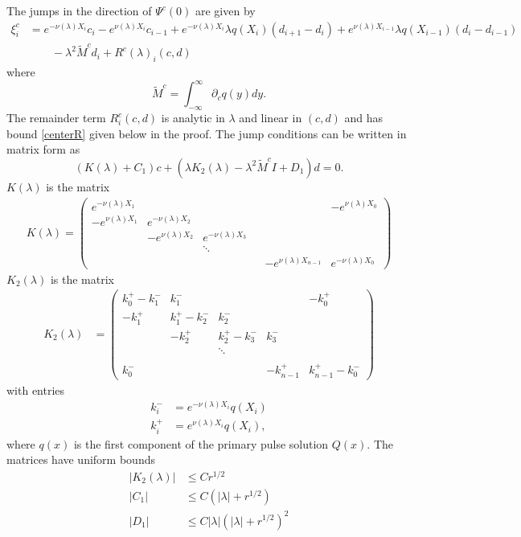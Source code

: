 \documentclass[thesis.tex]{subfiles}
\begin{document}
\begin{lemma}\label{jumpcenteradj}
The jumps in the direction of $\Psi^c(0)$ are given by
\begin{equation}\label{xic}
\begin{aligned}
\xi^c_i &= e^{-\nu(\lambda)X_i} c_i - e^{\nu(\lambda)X_i} c_{i-1} + e^{-\nu(\lambda)X_i} \lambda q(X_i) (d_{i+1} - d_i ) + e^{\nu(\lambda)X_{i-1}} \lambda q(X_{i-1}) (d_i - d_{i-1} ) \\
&\qquad- \lambda^2 \tilde{M}^c d_i + R^c(\lambda)_i(c, d)
\end{aligned}
\end{equation}
where
\[
\tilde{M}^c = \int_{-\infty}^\infty \partial_c q(y) dy.
\]
The remainder term $R^c_i(c, d)$ is analytic in $\lambda$ and linear in $(c, d)$ and has bound \cref{centerR} given below in the proof. The jump conditions can be written in matrix form as
\begin{equation}\label{matrixjumpc}
\left( K(\lambda) + C_1 \right) c + (\lambda K_2(\lambda) - \lambda^2 \tilde{M}^c I + D_1) d = 0.
\end{equation}
$K(\lambda)$ is the matrix
\begin{align*}
K(\lambda) =  
\begin{pmatrix}
e^{-\nu(\lambda)X_1} & & & & & -e^{\nu(\lambda)X_0} \\
-e^{\nu(\lambda)X_1} & e^{-\nu(\lambda)X_2} \\
& -e^{\nu(\lambda)X_2} & e^{-\nu(\lambda)X_3} \\
  & & \ddots & && \\
& & & & -e^{\nu(\lambda)X_{n-1}} & e^{-\nu(\lambda)X_0}
\end{pmatrix}
\end{align*}
$K_2(\lambda)$ is the matrix
\begin{align*}
K_2(\lambda) &= \begin{pmatrix}
k_0^+ - k_1^- & k_1^- &&& -k_0^+ \\
-k_1^+ & k_1^+ - k_2^- & k_2^- \\
& -k_2^+ & k_2^+ - k_3^- & k_3^- \\ && \ddots \\
\\
k_0^- &&& -k_{n-1}^+ & k_{n-1}^+ - k_0^- 
\end{pmatrix}
\end{align*}
with entries
\begin{align*}
k_i^- &= e^{-\nu(\lambda)X_i} q(X_i)\\
k_i^+ &= e^{\nu(\lambda)X_i} q(X_i),
\end{align*}
where $q(x)$ is the first component of the primary pulse solution $Q(x)$. The matrices have uniform bounds
\begin{align}\label{centerjumprem}
|K_2(\lambda)| &\leq C r^{1/2} \\
|C_1| &\leq C (|\lambda| + r^{1/2}) \\
|D_1| &\leq C |\lambda|(|\lambda| + r^{1/2})^2
\end{align}


\end{lemma}
\end{document}
